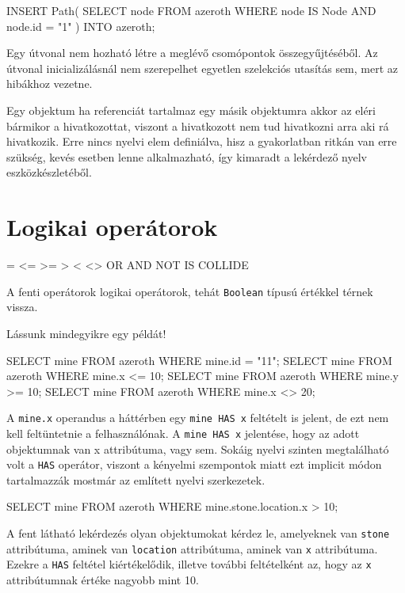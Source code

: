 \begin{sql}
INSERT Path(
    SELECT node FROM azeroth
    WHERE node IS Node AND node.id = "1"
) INTO azeroth;
\end{sql}

Egy útvonal nem hozható létre a meglévő csomópontok összegyűjtéséből. Az útvonal inicializálásnál nem szerepelhet egyetlen szelekciós utasítás sem, mert az hibákhoz vezetne.

Egy objektum ha referenciát tartalmaz egy másik objektumra akkor az eléri bármikor a hivatkozottat, viszont a hivatkozott nem tud hivatkozni arra aki rá hivatkozik. Erre nincs nyelvi elem definiálva, hisz a gyakorlatban ritkán van erre szükség, kevés esetben lenne alkalmazható, így kimaradt a lekérdező nyelv eszközkészletéből.

\section{Logikai operátorok}

\begin{sql}
=  <=  >=  >  <  <>
OR  AND  NOT  IS  COLLIDE
\end{sql}

A fenti operátorok logikai operátorok, tehát \texttt{Boolean} típusú értékkel térnek vissza.

Lássunk mindegyikre egy példát!

\begin{sql}
SELECT mine FROM azeroth WHERE mine.id = "11";
SELECT mine FROM azeroth WHERE mine.x <= 10;
SELECT mine FROM azeroth WHERE mine.y >= 10;
SELECT mine FROM azeroth WHERE mine.x <> 20;
\end{sql}

A \texttt{mine.x} operandus a háttérben egy \texttt{mine HAS x} feltételt is jelent, de ezt nem kell feltüntetnie a felhasználónak. A \texttt{mine HAS x} jelentése, hogy az adott objektumnak van x attribútuma, vagy sem. Sokáig nyelvi szinten megtalálható volt a \texttt{HAS} operátor, viszont a kényelmi szempontok miatt ezt implicit módon tartalmazzák mostmár az említett nyelvi szerkezetek.
 
\begin{sql}
SELECT mine FROM azeroth WHERE mine.stone.location.x > 10;
\end{sql}

A fent látható lekérdezés olyan objektumokat kérdez le, amelyeknek van \texttt{stone} attribútuma, aminek van \texttt{location} attribútuma, aminek van \texttt{x} attribútuma. Ezekre a \texttt{HAS} feltétel kiértékelődik, illetve további feltételként az, hogy az \texttt{x} attribútumnak értéke nagyobb mint 10.

